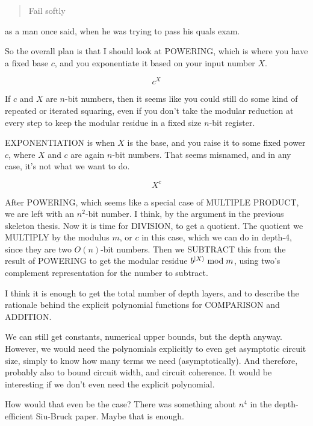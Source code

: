 \documentclass{article}
\begin{document}
\begin{quote}
Fail softly
\end{quote}

as a man once said, when he was trying to pass his quals exam.

So the overall plan is that I should look at POWERING, which is where you
have a fixed base $c$, and you exponentiate it based on your input number $X$.

\begin{equation}
c^X
\end{equation}

If $c$ and $X$ are $n$-bit numbers, then it seems like you could still do
some kind of repeated or iterated squaring, even if you don't take the
modular reduction at every step to keep the modular residue in a fixed size
$n$-bit register.

EXPONENTIATION is when $X$ is the base, and you raise it to some fixed power
$c$, where $X$ and $c$ are again $n$-bit numbers. That seems misnamed, and
in any case, it's not what we want to do.

\begin{equation}
X^c
\end{equation}

After POWERING, which seems like a special case of MULTIPLE PRODUCT, we
are left with an $n^2$-bit number. I think, by the argument in the previous
skeleton thesis. Now it is time for DIVISION, to get a quotient. The
quotient we MULTIPLY by the modulus $m$, or $c$ in this case, which we can
do in depth-4, since they are two $O(n)$-bit numbers. Then we SUBTRACT this
from the result of POWERING to get the modular residue $b^{\left\vert{X}\right\rangle} \bmod m$,
using two's complement representation for the number to subtract.

I think it is enough to get the total number of depth layers, and to
describe the rationale behind the explicit polynomial functions for
COMPARISON and ADDITION.

We can still get constants, numerical upper bounds, but the depth anyway.
However, we would need the polynomials explicitly to even get asymptotic
circuit size, simply to know how many terms we need (asymptotically).
And therefore, probably also to bound circuit width, and circuit coherence.
It would be interesting if we don't even need the explicit polynomial.

How would that even be the case? There was something about $n^4$ in the
depth-efficient Siu-Bruck paper. Maybe that is enough.
\end{document}
